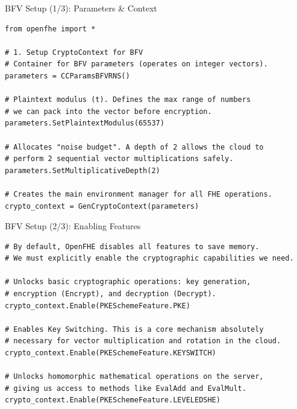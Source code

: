 \documentclass[aspectratio=169, 10pt]{beamer}
\begin{document}
\begin{frame}[fragile]{BFV Setup (1/3): Parameters \& Context}
\vspace{0.1cm}
\begin{lstlisting}[firstnumber=1]
from openfhe import *

# 1. Setup CryptoContext for BFV
# Container for BFV parameters (operates on integer vectors).
parameters = CCParamsBFVRNS()

# Plaintext modulus (t). Defines the max range of numbers 
# we can pack into the vector before encryption.
parameters.SetPlaintextModulus(65537)

# Allocates "noise budget". A depth of 2 allows the cloud to 
# perform 2 sequential vector multiplications safely.
parameters.SetMultiplicativeDepth(2)

# Creates the main environment manager for all FHE operations.
crypto_context = GenCryptoContext(parameters)
\end{lstlisting}
\end{frame}

\begin{frame}[fragile]{BFV Setup (2/3): Enabling Features}
\vspace{0.1cm}
\begin{lstlisting}[firstnumber=8]
# By default, OpenFHE disables all features to save memory. 
# We must explicitly enable the cryptographic capabilities we need.

# Unlocks basic cryptographic operations: key generation, 
# encryption (Encrypt), and decryption (Decrypt).
crypto_context.Enable(PKESchemeFeature.PKE)

# Enables Key Switching. This is a core mechanism absolutely 
# necessary for vector multiplication and rotation in the cloud.
crypto_context.Enable(PKESchemeFeature.KEYSWITCH)

# Unlocks homomorphic mathematical operations on the server, 
# giving us access to methods like EvalAdd and EvalMult.
crypto_context.Enable(PKESchemeFeature.LEVELEDSHE)
\end{lstlisting}
\end{frame}
\end{document}
